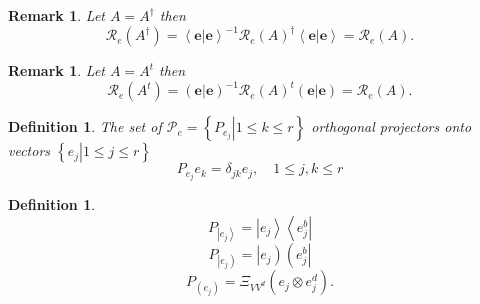 \documentclass[aps,preprint]{revtex4}%
\newtheorem{definition}[theorem]{Definition}
\newtheorem{remark}[theorem]{Remark}
\begin{document}
\begin{remark}
Let $A=A^{\dagger}$ then
\begin{equation}
\mathcal{R}_{e}\left(  A^{\dagger}\right)  =\left\langle \left.
\mathbf{e}\right\vert \mathbf{e}\right\rangle ^{-1}\mathcal{R}_{e}\left(
A\right)  ^{\dagger}\left\langle \left.  \mathbf{e}\right\vert \mathbf{e}%
\right\rangle =\mathcal{R}_{e}\left(  A\right)  .
\end{equation}

\end{remark}

\begin{remark}
Let $A=A^{t}$ then
\begin{equation}
\mathcal{R}_{e}\left(  A^{t}\right)  =\left(  \left.  \mathbf{e}\right\vert
\mathbf{e}\right)  ^{-1}\mathcal{R}_{e}\left(  A\right)  ^{t}\left(  \left.
\mathbf{e}\right\vert \mathbf{e}\right)  =\mathcal{R}_{e}\left(  A\right)  .
\end{equation}

\end{remark}

\begin{definition}
The set of $\mathcal{P}_{e}=\left\{  \left.  P_{e_{j}}\right\vert 1\leq k\leq
r\right\}  $ orthogonal projectors onto vectors $\left\{  \left.
e_{j}\right\vert 1\leq j\leq r\right\}  $%
\begin{equation}
P_{e_{j}}e_{k}=\delta_{jk}e_{j},\quad1\leq j,k\leq r
\end{equation}

\end{definition}

\begin{definition}%
\begin{equation}
P_{\left\vert e_{j}\right\rangle }=\left\vert e_{j}\right\rangle \left\langle
e_{j}^{b}\right\vert
\end{equation}%
\begin{equation}
P_{\left\vert e_{j}\right)  }=\left\vert e_{j}\right)  \left(  e_{j}%
^{b}\right\vert
\end{equation}%
\begin{equation}
P_{\left(  e_{j}\right)  }=\Xi_{VV^{d}}\left(  e_{j}\otimes e_{j}^{d}\right)
.
\end{equation}

\end{definition}
\end{document}
